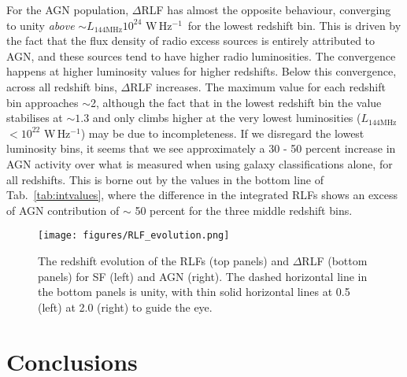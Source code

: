 \documentclass[usenatbib,fleqn,letters]{mnras}
\newcommand{\wphz}{$\,$W$\,$Hz$^{-1}$}
\newcommand{\llof}{$L_{\textrm{144MHz}}$}
\begin{document}
For the AGN population, $\Delta$RLF has almost the opposite behaviour, converging to unity \textit{above} $\sim$\llof $10^{24}\,$\wphz\ for the lowest redshift bin. This is driven by the fact that the flux density of radio excess sources is entirely attributed to AGN, and these sources tend to have higher radio luminosities. The convergence happens at higher luminosity values for higher redshifts. Below this convergence, across all redshift bins, $\Delta$RLF increases. The maximum value for each redshift bin approaches $\sim$2, although the fact that in the lowest redshift bin the value stabilises at $\sim1.3$ and only climbs higher at the very lowest luminosities (\llof $<10^{22}\,$\wphz ) may be due to incompleteness. If we disregard the lowest luminosity bins, it seems that we see approximately a 30 - 50 percent increase in AGN activity over what is measured when using galaxy classifications alone, for all redshifts. This is borne out by the values in the bottom line of Tab.~\ref{tab:intvalues}, where the difference in the integrated RLFs shows an excess of AGN contribution of $\sim$ 50 percent for the three middle redshift bins. 

\begin{figure*}
    \centering
    \texttt{[image: figures/RLF\_evolution.png]}
    \caption{The redshift evolution of the RLFs (top panels) and $\Delta$RLF (bottom panels) for SF (left) and AGN (right). The dashed horizontal line in the bottom panels is unity, with thin solid horizontal lines at 0.5 (left) at 2.0 (right) to guide the eye.  }
    \label{fig:evolution}
\end{figure*}


\section{Conclusions}
\label{sec:conclusions}
\end{document}
